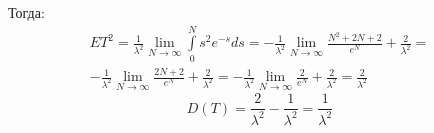 Тогда:
\begin{multline*}
ET^2 = \frac{1}{\lambda^2}\lim\limits_{N\rightarrow\infty}\int\limits_0^N s^2 e^{-s}ds = -\frac{1}{\lambda^2}\lim\limits_{N\rightarrow\infty}\frac{N^2+2N+2}{e^N}+\frac{2}{\lambda^2}=\\-\frac{1}{\lambda^2}\lim\limits_{N\rightarrow\infty}\frac{2N+2}{e^N}+\frac{2}{\lambda^2}=-\frac{1}{\lambda^2}\lim\limits_{N\rightarrow\infty}\frac{2}{e^N}+\frac{2}{\lambda^2}=\frac{2}{\lambda^2}
\end{multline*}
$$D(T) = \frac{2}{\lambda^2}-\frac{1}{\lambda^2}=\frac{1}{\lambda^2}$$
